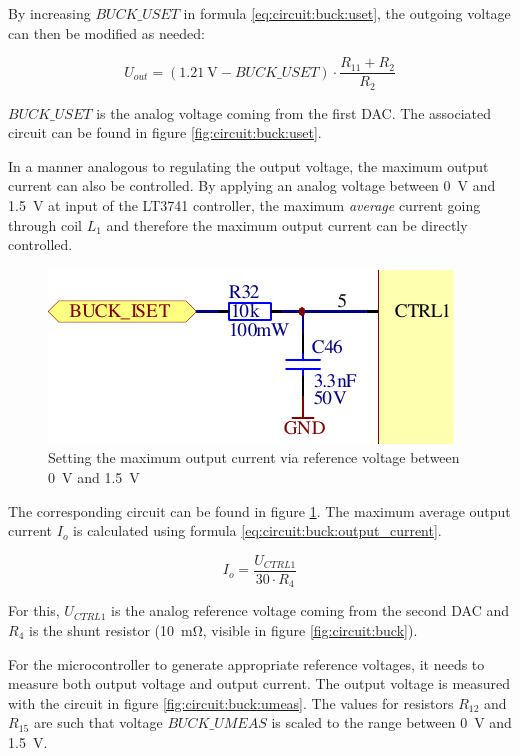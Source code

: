 By increasing $BUCK\_USET$ in formula \ref{eq:circuit:buck:uset}, the outgoing
voltage can then be modified as needed:

\begin{equation}
    U_{out} = (\SI{1.21}{\volt} - BUCK\_USET) \cdot \frac{R_{11} + R_2}{R_2}
    \label{eq:circuit:buck:uset}
\end{equation}

$BUCK\_USET$ is the  analog voltage coming from the  first DAC. The associated
circuit can be found in figure \ref{fig:circuit:buck:uset}.

In a  manner analogous to  regulating the  output voltage, the  maximum output
current  can  also be  controlled.   By  applying  an analog  voltage  between
\SI{0}{\volt}  and  \SI{1.5}{\volt}  at   input    of  the  LT3741
controller, the  maximum \emph{average} current  going through coil  $L_1$ and
therefore the maximum output current can be directly controlled.

\begin{figure}[th!]
    \center
    \includegraphics[width=.4\textwidth]{images/circuit/buck-iset.pdf}
    \caption{Setting the maximum output current via reference voltage between \SI{0}{\volt} and \SI{1.5}{\volt}}
    \label{fig:circuit:buck:iset}
\end{figure}

The corresponding circuit can be  found in figure \ref{fig:circuit:buck:iset}.
The maximum  average   output  current  $I_o$  is   calculated  using  formula
\ref{eq:circuit:buck:output_current}.

\begin{equation}
    I_o = \frac{U_{CTRL1}}{30 \cdot R_4}
    \label{eq:circuit:buck:output_current}
\end{equation}

For this, $U_{CTRL1}$  is the analog reference voltage coming  from the second
DAC and  $R_4$ is the  shunt resistor (\SI{10}{\milli\ohm}, visible  in figure
\ref{fig:circuit:buck}).

For the microcontroller  to generate appropriate reference  voltages, it needs
to  measure both  output voltage  and  output current. The  output voltage  is
measured with  the circuit in figure  \ref{fig:circuit:buck:umeas}. The values
for resistors  $R_{12}$ and  $R_{15}$ are such  that voltage  $BUCK\_UMEAS$ is
scaled to the range between \SI{0}{\volt} and \SI{1.5}{\volt}.

